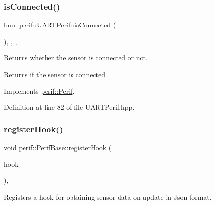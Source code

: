 \subsubsection{\texorpdfstring{isConnected()}{isConnected()}}
{\footnotesize\ttfamily bool perif\+::\+U\+A\+R\+T\+Perif\+::is\+Connected (\begin{DoxyParamCaption}{ }\end{DoxyParamCaption})\hspace{0.3cm}{\ttfamily [inline]}, {\ttfamily [override]}, {\ttfamily [virtual]}, {\ttfamily [inherited]}}

Returns whether the sensor is connected or not.

\begin{DoxyReturn}{Returns}
if the sensor is connected 
\end{DoxyReturn}


Implements \mbox{\hyperlink{classperif_1_1Perif_ab9a17fad04e595f3ac0c78b9d3be4c9e}{perif\+::\+Perif}}.



Definition at line 82 of file U\+A\+R\+T\+Perif.\+hpp.


\begin{DoxyCode}{0}

\end{DoxyCode}
\mbox{\label{classperif_1_1PerifBase_a2e8bcc221ee253b21b61c7c07307d931}} 
\subsubsection{\texorpdfstring{registerHook()}{registerHook()}}
{\footnotesize\ttfamily void perif\+::\+Perif\+Base\+::register\+Hook (\begin{DoxyParamCaption}\item[{function$<$ void(\mbox{\hyperlink{Perif_8hpp_a358ff4ee6d24694ee7661f0cce14377e}{Dev\+Map}} \&)$>$ \&\&}]{hook }\end{DoxyParamCaption})\hspace{0.3cm}{\ttfamily [inline]}, {\ttfamily [inherited]}}

Registers a hook for obtaining sensor data on update in Json format.


